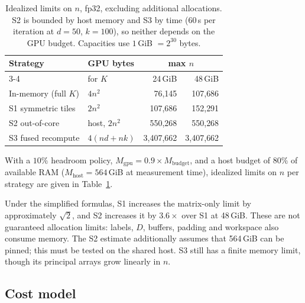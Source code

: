 \documentclass[sigconf]{acmart}
\begin{document}
\begin{table}[t]
  \caption{Idealized limits on $n$, fp32, excluding additional allocations.
    S2 is bounded by host memory and S3 by time (60\,s per iteration at
    $d = 50$, $k = 100$), so neither depends on the GPU budget. Capacities use
    $1$\,GiB $= 2^{30}$ bytes.}
  \label{tab:maxn}
  \small
  \begin{tabular}{llrr}
    \toprule
    Strategy & GPU bytes & \multicolumn{2}{c}{max $n$} \\
    \cmidrule(l){3-4}
             & for $K$ & 24\,GiB & 48\,GiB \\
    \midrule
    In-memory (full $K$)  & $4n^2$              & 76{,}145   & 107{,}686 \\
    S1 symmetric tiles    & $2n^2$              & 107{,}686  & 152{,}291 \\
    S2 out-of-core        & host, $2n^2$        & 550{,}268  & 550{,}268 \\
    S3 fused recompute    & $4(nd{+}nk)$        & 3{,}407{,}662 & 3{,}407{,}662 \\
    \bottomrule
  \end{tabular}
\end{table}

With a $10\%$ headroom policy, $M_{\mathrm{gpu}} = 0.9 \times
M_{\mathrm{budget}}$, and a host budget of $80\%$ of available RAM
($M_{\mathrm{host}} = 564$\,GiB at measurement time), idealized limits on $n$
per strategy are given in Table~\ref{tab:maxn}.

Under the simplified formulas, S1 increases the matrix-only limit by
approximately $\sqrt{2}$, and S2 increases it by $3.6\times$ over S1 at
48\,GiB. These are not guaranteed allocation limits: labels, $D$, buffers,
padding and workspace also consume memory. The S2 estimate additionally assumes
that 564\,GiB can be pinned; this must be tested on the shared host. S3 still
has a finite memory limit, though its principal arrays grow linearly in $n$.

\subsection{Cost model}
\end{document}

